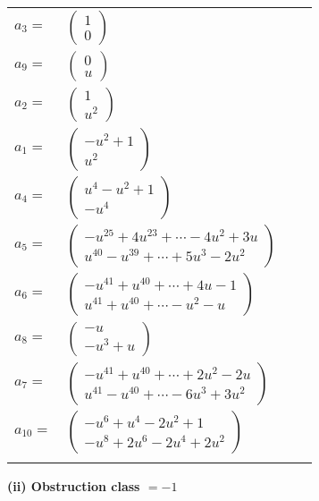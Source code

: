 \documentclass[1p]{elsarticle_modified}
\theoremstyle{definition}
\begin{document}
\begin{tabular}{m{7pt} m{180pt} m{7pt} m{180pt} }
\flushright $a_{3}=$&$\begin{pmatrix}1\\0\end{pmatrix}$ \\
\flushright $a_{9}=$&$\begin{pmatrix}0\\u\end{pmatrix}$ \\
\flushright $a_{2}=$&$\begin{pmatrix}1\\u^2\end{pmatrix}$ \\
\flushright $a_{1}=$&$\begin{pmatrix}- u^2+1\\u^2\end{pmatrix}$ \\
\flushright $a_{4}=$&$\begin{pmatrix}u^4- u^2+1\\- u^4\end{pmatrix}$ \\
\flushright $a_{5}=$&$\begin{pmatrix}- u^{25}+4 u^{23}+\cdots-4 u^2+3 u\\u^{40}- u^{39}+\cdots+5 u^3-2 u^2\end{pmatrix}$ \\
\flushright $a_{6}=$&$\begin{pmatrix}- u^{41}+u^{40}+\cdots+4 u-1\\u^{41}+u^{40}+\cdots- u^2- u\end{pmatrix}$ \\
\flushright $a_{8}=$&$\begin{pmatrix}- u\\- u^3+u\end{pmatrix}$ \\
\flushright $a_{7}=$&$\begin{pmatrix}- u^{41}+u^{40}+\cdots+2 u^2-2 u\\u^{41}- u^{40}+\cdots-6 u^3+3 u^2\end{pmatrix}$ \\
\flushright $a_{10}=$&$\begin{pmatrix}- u^6+u^4-2 u^2+1\\- u^8+2 u^6-2 u^4+2 u^2\end{pmatrix}$\\&\end{tabular}
\flushleft \textbf{(ii) Obstruction class $= -1$}\\~\\
\end{document}
